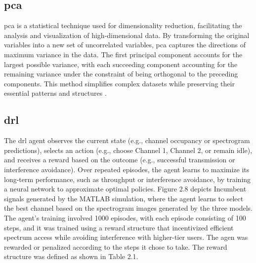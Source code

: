 \subsection{\gls{pca}}
\gls{pca} is a statistical technique used for dimensionality reduction, facilitating the analysis and visualization of high-dimensional data. By transforming the original variables into a new set of uncorrelated variables, \gls{pca} captures the directions of maximum variance in the data. The first principal component accounts for the largest possible variance, with each succeeding component accounting for the remaining variance under the constraint of being orthogonal to the preceding components. This method simplifies complex datasets while preserving their essential patterns and structures \cite{12}.

\subsection{\gls{drl}}
The \gls{drl} agent observes the current state (e.g., channel occupancy or spectrogram predictions), selects an action (e.g., choose Channel 1, Channel 2, or remain idle), and receives a reward based on the outcome (e.g., successful transmission or interference avoidance). Over repeated episodes, the agent learns to maximize its long-term performance, such as throughput or interference avoidance, by training a neural network to approximate optimal policies. Figure 2.8 depicts Incumbent signals generated by the MATLAB simulation, where the agent learns to select the best channel based on the spectrogram images generated by the three models. The agent's training involved 1000 episodes, with each episode consisting of 100 steps, and it was trained using a reward structure that incentivized efficient spectrum access while avoiding interference with higher-tier users.
The agen was rewarded or penalized according to the steps it chose to take. The reward structure was defined as shown in Table 2.1.

